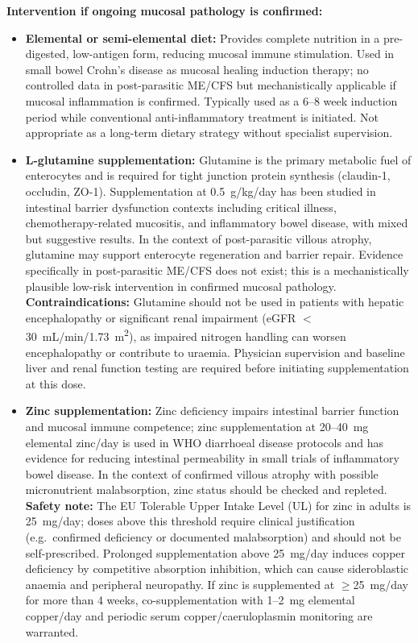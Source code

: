 \textbf{Intervention if ongoing mucosal pathology is confirmed:}

\begin{itemize}
  \item \textbf{Elemental or semi-elemental diet:} Provides complete nutrition in a pre-digested, low-antigen form, reducing mucosal immune stimulation. Used in small bowel Crohn's disease as mucosal healing induction therapy; no controlled data in post-parasitic ME/CFS but mechanistically applicable if mucosal inflammation is confirmed. Typically used as a 6--8 week induction period while conventional anti-inflammatory treatment is initiated. Not appropriate as a long-term dietary strategy without specialist supervision.

  \item \textbf{L-glutamine supplementation:} Glutamine is the primary metabolic fuel of enterocytes and is required for tight junction protein synthesis (claudin-1, occludin, ZO-1). Supplementation at 0.5~g/kg/day has been studied in intestinal barrier dysfunction contexts including critical illness, chemotherapy-related mucositis, and inflammatory bowel disease, with mixed but suggestive results. In the context of post-parasitic villous atrophy, glutamine may support enterocyte regeneration and barrier repair. Evidence specifically in post-parasitic ME/CFS does not exist; this is a mechanistically plausible low-risk intervention in confirmed mucosal pathology. \textbf{Contraindications:} Glutamine should not be used in patients with hepatic encephalopathy or significant renal impairment (eGFR $<$30~mL/min/1.73~m\textsuperscript{2}), as impaired nitrogen handling can worsen encephalopathy or contribute to uraemia. Physician supervision and baseline liver and renal function testing are required before initiating supplementation at this dose.

  \item \textbf{Zinc supplementation:} Zinc deficiency impairs intestinal barrier function and mucosal immune competence; zinc supplementation at 20--40~mg elemental zinc/day is used in WHO diarrhoeal disease protocols and has evidence for reducing intestinal permeability in small trials of inflammatory bowel disease. In the context of confirmed villous atrophy with possible micronutrient malabsorption, zinc status should be checked and repleted. \textbf{Safety note:} The EU Tolerable Upper Intake Level (UL) for zinc in adults is 25~mg/day; doses above this threshold require clinical justification (e.g.\ confirmed deficiency or documented malabsorption) and should not be self-prescribed. Prolonged supplementation above 25~mg/day induces copper deficiency by competitive absorption inhibition, which can cause sideroblastic anaemia and peripheral neuropathy. If zinc is supplemented at $\geq$25~mg/day for more than 4 weeks, co-supplementation with 1--2~mg elemental copper/day and periodic serum copper/caeruloplasmin monitoring are warranted.
\end{itemize}

